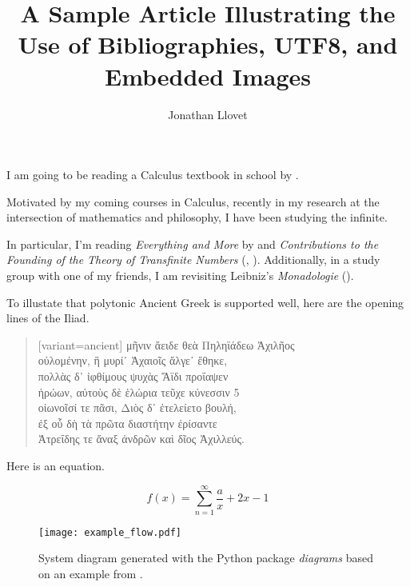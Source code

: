 \documentclass{article}
\title{A Sample Article Illustrating the Use of Bibliographies, UTF8, and Embedded Images}
\author{Jonathan Llovet}
\date{}
\begin{document}
\maketitle

I am going to be reading a Calculus textbook in school by \textcite{briggsCalculusEarlyTranscendentals2019}.

Motivated by my coming courses in Calculus,
recently in my research at the intersection of mathematics and philosophy,
I have been studying the infinite.

In particular, I'm reading \textit{Everything and More} by \textcite{wallaceEverythingMoreCompact2010}
and \textit{Contributions to the Founding of the Theory of Transfinite Numbers}
(\textcite{cantorContributionsFoundingTheory1955}, \textcite{cantorGesammelteAbhandlungenMathematischen2013}).
Additionally, in a study group with one of my friends,
I am revisiting Leibniz's \textit{Monadologie} (\textcite{leibnizMonadologieFranzosischDeutsch2017}).

To illustate that polytonic Ancient Greek is supported well, here are the opening lines of the Iliad. \textcite{homereHomeriOpera1920}

\begin{quote}
    \begin{greek}[variant=ancient]
        μῆνιν ἄειδε θεὰ Πηληϊάδεω Ἀχιλῆος\\
        οὐλομένην, ἣ μυρί᾽ Ἀχαιοῖς ἄλγε᾽ ἔθηκε,\\
        πολλὰς δ᾽ ἰφθίμους ψυχὰς Ἄϊδι προΐαψεν\\
        ἡρώων, αὐτοὺς δὲ ἑλώρια τεῦχε κύνεσσιν \hfill 5\\
        οἰωνοῖσί τε πᾶσι, Διὸς δ᾽ ἐτελείετο βουλή,\\
        ἐξ οὗ δὴ τὰ πρῶτα διαστήτην ἐρίσαντε\\
        Ἀτρεΐδης τε ἄναξ ἀνδρῶν καὶ δῖος Ἀχιλλεύς.\\
    \end{greek}
\end{quote}

Here is an equation.

\begin{equation}
    f(x) = \sum_{n = 1}^{\infty} \frac{a}{x} + 2x - 1
\end{equation}

\newpage
\begin{figure}[t]
    \texttt{[image: example\_flow.pdf]}
    \centering
    \caption{System diagram generated with the Python package \textit{diagrams} based on an example from \textcite{senCreateNeatTechnical2022}.}
    \label{fig:system1}
\end{figure}
\end{document}
